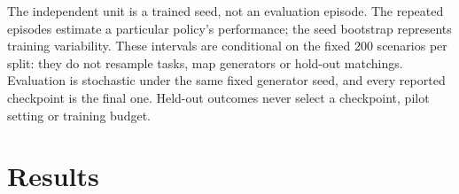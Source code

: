 The independent unit is a trained seed, not an evaluation episode. The
repeated episodes estimate a particular policy's performance; the seed
bootstrap represents training variability. These intervals are
conditional on the fixed 200 scenarios per split: they do not resample
tasks, map generators or hold-out matchings. Evaluation is stochastic
under the same fixed generator seed, and every reported checkpoint is
the final one. Held-out outcomes never select a checkpoint, pilot
setting or training budget.

\section{Results}\label{results}

\begin{center}
\small
{}
\end{center}

